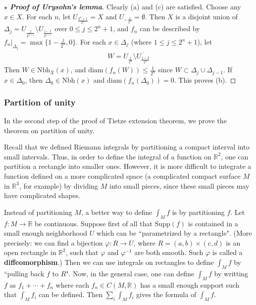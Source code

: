 \documentclass[12pt,b5paper,notitlepage]{article}
\theoremstyle{definition}
\theoremstyle{plain}
\newcommand{\ovl}{\overline}
\newcommand{\Rbb}{\mathbb R}
\newcommand{\Supp}{\mathrm{Supp}}
\newcommand{\Nbh}{\mathrm{Nbh}}
\newcommand{\diam}{\mathrm{diam}}
\numberwithin{equation}{section}
\begin{document}
\begin{proof}[$\star$ \textbf{Proof of Urysohn's lemma}]
Clearly (a) and (c) are satisfied. Choose any $x\in X$. For each $n$, let $U_{\frac {2^n+1}{2^n}}=X$ and $U_{-\frac 1{2^n}}=\emptyset$. Then $X$ is a disjoint  union of $\Delta_j=U_{\frac j{2^{n+1}}}\setminus U_{\frac{j-1}{2^{n+1}}}$ over $0\leq j\leq 2^n+1$, and $f_n$ can be described by $f_n|_{\Delta_j}=\max\{1-\frac j{2^n},0\}$. For each $x\in \Delta_j$ (where $1\leq j\leq 2^n+1$), let
\begin{align*}
W=U_{\frac{j}{2^n}}\setminus\ovl{U_{\frac{j-2}{2^n}} }
\end{align*}
Then $W\in\Nbh_X(x)$, and $\diam(f_n(W))\leq \frac 1{2^n}$ since $W\subset \Delta_j\cup\Delta_{j-1}$. If $x\in\Delta_0$, then $\Delta_0\in\Nbh(x)$ and $\diam(f_n(\Delta_0))=0$. This proves (b).
\end{proof}



\subsubsection{Partition of unity}\label{lb467}


In the second step of the proof of Tietze extension theorem, we prove the theorem on partition of unity.

Recall that we defined Riemann integrals by partitioning a compact interval into small intervals. Thus, in order to define the integral of a function on $\Rbb^2$, one can partition a rectangle into smaller ones. However, it is more difficult to integrate a function defined on a more complicated space (a complicated compact surface $M$ in $\Rbb^3$, for example) by dividing $M$ into small pieces, since these small pieces may have complicated shapes.

Instead of partitioning $M$, a better way to define $\int_Mf$ is by partitioning $f$. Let $f:M\rightarrow\Rbb$ be continuous. Suppose first of all that $\Supp(f)$ is contained in a small enough neighborhood $U$ which can be ``parametrized by a rectangle". (More precisely: we can find a bijection $\varphi:R\rightarrow U$, where $R=(a,b)\times(c,d)$ is an open rectangle in $\Rbb^2$, such that $\varphi$ and $\varphi^{-1}$ are both smooth. Such $\varphi$ is called a \textbf{diffeomorphism}.) Then we can use integrals on rectangles to define $\int_Mf$ by ``pulling back $f$ to $R$". Now, in the general case, one can define $\int_Mf$ by writting $f$ as $f_1+\cdots+f_n$ where each $f_n\in C(M,\Rbb)$ has a small enough support such that $\int_Mf_i$ can be defined. Then $\sum_i\int_Mf_i$ gives the formula of $\int_Mf$. 
\end{document}
